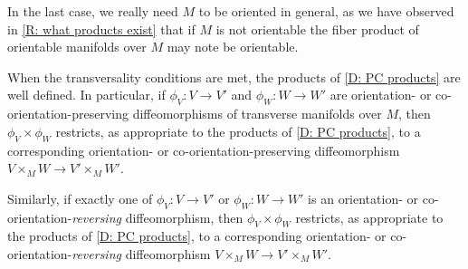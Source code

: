 In the last case, we really need $M$ to be oriented in general, as we have observed in \cref{R: what products exist} that if $M$ is not orientable the fiber product of orientable manifolds over $M$ may note be orientable.

\begin{comment}
In the cases where $r_V$ and $r_W$ are transverse embeddings, these products are represented by just taking intersections, with the orientations or co-orientations given explicitly in \cref{P: normal pullback,P: cap of immersions,P: orient intersection}.
If $r_V$ and $r_W$ are immersions, these descriptions hold locally.
\end{comment}

\begin{lemma}\label{L: product preserves iso}
	When the transversality conditions are met, the products of \cref{D: PC products} are well defined.
	In particular, if $\phi_V \colon V \to V'$ and $\phi_W \colon W \to W'$ are orientation- or co-orientation-preserving diffeomorphisms of transverse manifolds over $M$, then $\phi_V \times \phi_W$ restricts, as appropriate to the products of \cref{D: PC products}, to a corresponding orientation- or co-orientation-preserving diffeomorphism $V \times_M W \to V' \times_M W'$.

	Similarly, if exactly one of $\phi_V \colon V \to V'$ or $\phi_W \colon W \to W'$ is an orientation- or co-orientation-\textit{reversing} diffeomorphism, then $\phi_V \times \phi_W$ restricts, as appropriate to the products of \cref{D: PC products}, to a corresponding orientation- or co-orientation-\textit{reversing} diffeomorphism $V \times_M W \to V' \times_M W'$.
\end{lemma}
